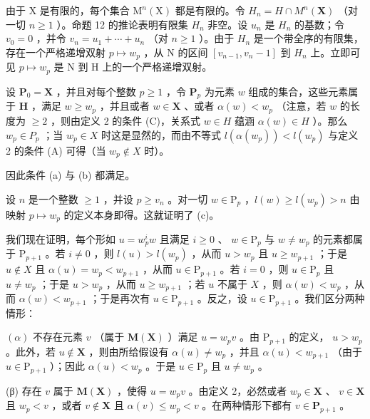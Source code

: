 由于 X 是有限的，每个集合 \(\mathrm{M}^{n}(\mathrm{X})\) 都是有限的。令 \(H_{n}=H\cap M^{n}(\mathbf{X})\) （对一切 \(n\geqslant1\) ）。命题 12 的推论表明有限集 \(H_{n}\) 非空。设 \(u_{n}\) 是 \(H_{n}\) 的基数；令 \(v_{0}=0\) ，并令 \(v_{n}=u_{1}+\cdots+u_{n}\) （对 \(n\geqslant1\) ）。由于 \(H_{n}\) 是一个带全序的有限集，存在一个严格递增双射 \(p\mapsto w_{p}\) ，从 N 的区间 \([v_{n-1},v_{n}-1]\) 到 \(H_{n}\) 上。立即可见 \(p\mapsto w_{p}\) 是 N 到 H 上的一个严格递增双射。

设 \(\mathbf{P}_0 = \mathbf{X}\) ，并且对每个整数 \(p \geqslant 1\) ，令 \(\mathbf{P}_p\) 为元素 \(w\) 组成的集合，这些元素属于 \(\mathbf{H}\) ，满足 \(w \geqslant w_p\) ，并且或者 \(w \in \mathbf{X}\) 、或者 \(\alpha(w) < w_p\) （注意，若 \(w\) 的长度为 \(\geqslant2\) ，则由定义 2 的条件 (C)，关系式 \(w\in H\) 蕴涵 \(\alpha(w)\in H\) ）。那么 \(w_{p}\in P_{p}\) ；当 \(w_{p}\in X\) 时这是显然的，而由不等式 \(l(\alpha(w_{p}))<l(w_{p})\) 与定义 2 的条件 (A) 可得（当 \(w_{p}\notin X\) 时）。

因此条件 (a) 与 (b) 都满足。

设 \(n\) 是一个整数 \(\geqslant 1\) ，并设 \(p \geqslant v_n\) 。对一切 \(w \in \mathrm{P}_p\) ，\(l(w) \geqslant l(w_p) > n\) 由映射 \(p \mapsto w_p\) 的定义本身即得。这就证明了 (c)。

我们现在证明，每个形如 \(u = w_{p}^{i}w\) 且满足 \(i \geqslant 0\) 、 \(w \in \mathrm{P}_{p}\) 与 \(w \neq w_{p}\) 的元素都属于 \(\mathrm{P}_{p+1}\) 。若 \(i \neq 0\) ，则 \(l(u) > l(w_{p})\) ，从而 \(u > w_{p}\) 且 \(u \geqslant w_{p+1}\) ；于是 \(u \notin X\) 且 \(\alpha(u) = w_{p} < w_{p+1}\) ，从而 \(u \in \mathrm{P}_{p+1}\) 。若 \(i = 0\) ，则 \(u \in \mathrm{P}_{p}\) 且 \(u \neq w_{p}\) ；于是 \(u > w_{p}\) ，从而 \(u \geqslant w_{p+1}\) ；若 \(u\) 不属于 \(X\) ，则 \(\alpha(w) < w_{p}\) ，从而 \(\alpha(w) < w_{p+1}\) ；于是再次有 \(u \in \mathrm{P}_{p+1}\) 。反之，设 \(u \in \mathrm{P}_{p+1}\) 。我们区分两种情形：

\((\alpha)\) 不存在元素 \(v\) （属于 \(\mathbf{M}(\mathbf{X})\) ）满足 \(u = w_{p}v\) 。由 \(\mathrm{P}_{p + 1}\) 的定义， \(u > w_{p}\) 。此外，若 \(u\notin \mathbf{X}\) ，则由所给假设有 \(\alpha (u)\neq w_p\) ，并且 \(\alpha (u) < w_{p + 1}\) （由于 \(u\in \mathrm{P}_{p + 1}\) ）；因此 \(\alpha (u) < w_{p}\) 。于是 \(u\in \mathrm{P}_p\) 且 \(u\neq w_{p}\) 。

(β) 存在 \(v\) 属于 \(\mathbf{M}(\mathbf{X})\) ，使得 \(u = w_{p}v\) 。由定义 2，必然或者 \(w_{p} \in \mathbf{X}\) 、 \(v \in \mathbf{X}\) 且 \(w_{p} < v\) ，或者 \(v \notin \mathbf{X}\) 且 \(\alpha(v) \leqslant w_{p} < v\) 。在两种情形下都有 \(v \in \mathbf{P}_{p+1}\) 。

